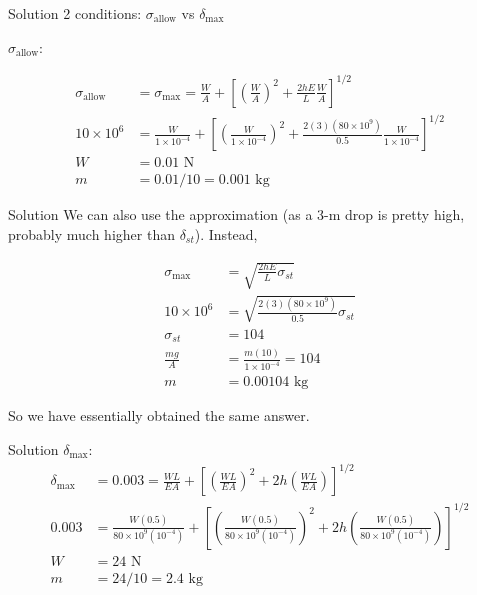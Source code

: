 \documentclass[10pt, svgnames]{beamer}
\begin{document}
\begin{frame}[label={sec:orgd48c47d}]{Solution}
2 conditions: \(\sigma_{\text{allow}}\) vs \(\delta_{\max}\)

\(\sigma_{\text{allow}}\):

\begin{align*}
    \sigma_{\text{allow}} &= \sigma_{\max} = \frac{W}{A} + \left[ \left( \frac{W}{A} \right)^{2} + \frac{2hE}{L}\frac{W}{A} \right]^{1/2} \\
    10 \times 10^{6} &= \frac{W}{1 \times 10^{-4}} + \left[ \left( \frac{W}{1 \times 10^{-4}} \right)^{2} + \frac{2(3)(80 \times 10^{9})}{0.5}\frac{W}{1 \times 10^{-4}} \right]^{1/2} \\
    W &= 0.01 \text{ N} \\
    m &= 0.01/10 = 0.001 \text{ kg}
\end{align*}
\end{frame}

\begin{frame}[label={sec:org821faf4}]{Solution}
We can also use the approximation (as a 3-m drop is pretty high, probably much higher than \(\delta_{st}\)). Instead,

\begin{align*}
    \sigma_{\max} &= \sqrt{\frac{2hE}{L} \sigma_{st}} \\
    10 \times 10^{6} &= \sqrt{\frac{2(3)(80 \times 10^{9})}{0.5}\sigma_{st}} \\
    \sigma_{st} &= 104 \\
    \frac{mg}{A} &= \frac{m(10)}{1 \times 10^{-4}} = 104 \\
    m &= 0.00104 \text{ kg}
\end{align*}

So we have essentially obtained the same answer.
\end{frame}

\begin{frame}[label={sec:orgdb0eebe}]{Solution \(\delta_{\max}\):}
\begin{align*}
    \delta_{\max} &= 0.003 = \frac{WL}{EA} + \left[ \left( \frac{WL}{EA} \right)^{2} + 2h \left( \frac{WL}{EA} \right) \right]^{1/2} \\
    0.003 &= \frac{W(0.5)}{80 \times 10^{9}(10^{-4})} + \left[ \left( \frac{W(0.5)}{80 \times 10^{9}(10^{-4})} \right)^{2} + 2h \left(  \frac{W(0.5)}{80 \times 10^{9}(10^{-4})} \right) \right]^{1/2} \\
    W &= 24 \text{ N} \\
    m &= 24/10 = 2.4 \text{ kg}
\end{align*}
\end{frame}
\end{document}
